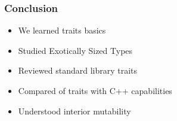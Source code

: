 \documentclass[aspectratio=1610,t]{beamer}
\begin{document}

\begin{frame}[fragile]
\frametitle{Conclusion}
\begin{itemize}
    \item We learned traits basics
    \item Studied Exotically Sized Types
    \item Reviewed standard library traits
    \item Compared of traits with C++ capabilities
    \item Understood interior mutability
\end{itemize}
\end{frame}

\end{document}

